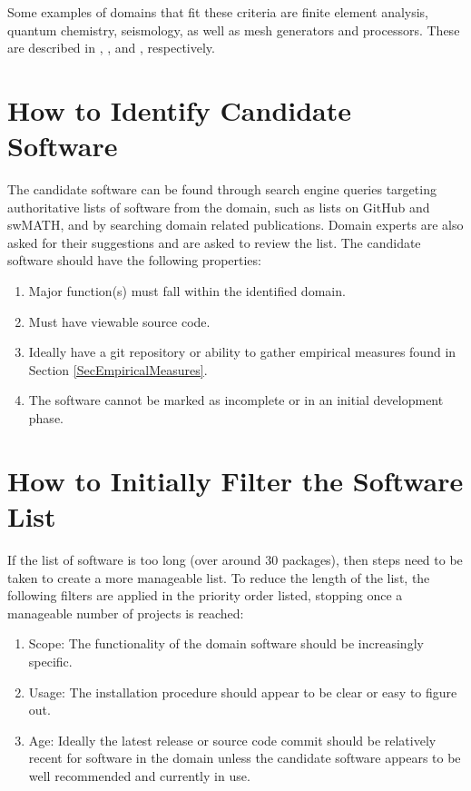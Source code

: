 \documentclass[letterpaper,cleveref]{lipics-v2019}
\theoremstyle{definition}
\begin{document}
Some examples of domains that fit these criteria are finite element analysis,
quantum chemistry, seismology, as well as mesh generators and processors. These
are described in \citep{szabo1996finite}, \citep{veryazov20042molcas},
\citep{SmithEtAl2018} and \citep{smith2016state}, respectively.

\section{How to Identify Candidate Software} \label{SecIdentifyCandSoft}

The candidate software can be found through search engine queries targeting
authoritative lists of software from the domain, such as lists on GitHub and
swMATH, and by searching domain related publications. Domain experts are also
asked for their suggestions and are asked to review the list. The candidate
software should have the following properties:

\begin{enumerate}
\item Major function(s) must fall within the identified domain.
\item Must have viewable source code.
\item Ideally have a git repository or ability to gather empirical measures
  found in Section \ref{SecEmpiricalMeasures}.
\item The software cannot be marked as incomplete or in an initial development
  phase.
\end{enumerate}

\section{How to Initially Filter the Software List} \label{SecInitialFilter}

If the list of software is too long (over around 30 packages), then steps need
to be taken to create a more manageable list. To reduce the length of the list,
the following filters are applied in the priority order listed, stopping once
a manageable number of projects is reached:

\begin{enumerate}
\item Scope: The functionality of the domain software should be increasingly
  specific.
\item Usage: The installation procedure should appear to be clear or easy to
  figure out.
\item Age: Ideally the latest release or source code commit should be relatively
  recent for software in the domain unless the candidate software appears to be
  well recommended and currently in use.
\end{enumerate}
\end{document}
